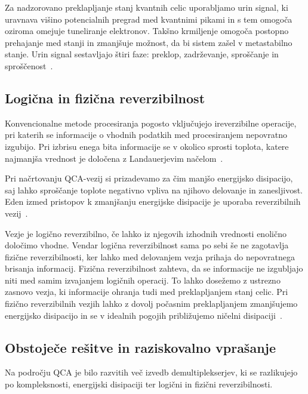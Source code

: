 Za nadzorovano preklapljanje stanj kvantnih celic uporabljamo urin signal, ki uravnava višino potencialnih pregrad med kvantnimi pikami in s tem omogoča oziroma omejuje tuneliranje elektronov. Takšno krmiljenje omogoča postopno prehajanje med stanji in zmanjšuje možnost, da bi sistem zašel v metastabilno stanje. Urin signal sestavljajo štiri faze: preklop, zadrževanje, sproščanje in sproščenost~\cite{g21:janez2012}.

\subsection{Logična in fizična reverzibilnost}
\label{g21:sec:reverzibilnost}

Konvencionalne metode procesiranja pogosto vključujejo ireverzibilne operacije, pri katerih se informacije o vhodnih podatkih med procesiranjem nepovratno izgubijo. Pri izbrisu enega bita informacije se v okolico sprosti toplota, katere najmanjša vrednost je določena z Landauerjevim načelom~\cite{landauer1961,g21:alharbi2023alu}.

Pri načrtovanju QCA-vezij si prizadevamo za čim manjšo energijsko disipacijo, saj lahko sproščanje toplote negativno vpliva na njihovo delovanje in zanesljivost. Eden izmed pristopov k zmanjšanju energijske disipacije je uporaba reverzibilnih vezij~\cite{g21:alharbi2023alu}. 

Vezje je logično reverzibilno, če lahko iz njegovih izhodnih vrednosti enolično določimo vhodne. Vendar logična reverzibilnost sama po sebi še ne zagotavlja fizične reverzibilnosti, ker lahko med delovanjem vezja prihaja do nepovratnega brisanja informacij. Fizična reverzibilnost zahteva, da se informacije ne izgubljajo niti med samim izvajanjem logičnih operacij. To lahko dosežemo z ustrezno zasnovo vezja, ki informacije ohranja tudi med preklapljanjem stanj celic. Pri fizično reverzibilnih vezjih lahko z dovolj počasnim preklapljanjem zmanjšujemo energijsko disipacijo in se v idealnih pogojih približujemo ničelni disipaciji~\cite{g21:alharbi2023alu}.

\subsection{Obstoječe rešitve in raziskovalno vprašanje}
\label{g21:sec:resitve}

Na področju QCA je bilo razvitih več izvedb demultiplekserjev, ki se razlikujejo po kompleksnosti, energijski disipaciji ter logični in fizični reverzibilnosti.

